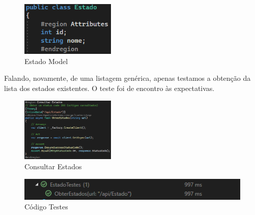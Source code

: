 \begin{figure}[!h]
\centering
\includegraphics[width=0.4\textwidth]{Figuras/Models/EstadoModel.png}
\caption{Estado Model}
\label{d.model}
\end{figure}

\indent \par Falando, novamente, de uma listagem genérica, apenas testamos a obtenção da lista dos estados existentes. O teste foi de encontro às expectativas.

\begin{figure}[!h]
\centering
\includegraphics[width=0.4\textwidth]{Figuras/TestesUnitarios/Estado/Consultar Estados.png}
\caption{Consultar Estados}
\label{d.unitario}
\end{figure}

\begin{figure}[!h]
\centering
\includegraphics[width=1\textwidth]{Figuras/Testes/EstadoTestes.png}
\caption{Código Testes}
\label{d.teste}
\end{figure}

\newpage


